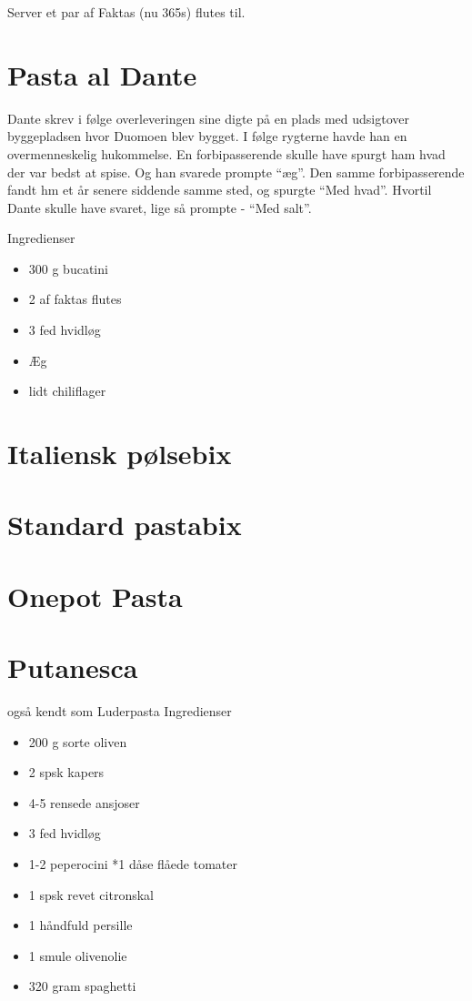 \documentclass[
]{book}
\providecommand{\tightlist}{%
  \setlength{\itemsep}{0pt}\setlength{\parskip}{0pt}}
\begin{document}
Server et par af Faktas (nu 365s) flutes til.

\hypertarget{pasta-al-dante}{%
\section{Pasta al Dante}\label{pasta-al-dante}}

Dante skrev i følge overleveringen sine digte på en plads med udsigtover byggepladsen hvor Duomoen blev bygget. I følge rygterne havde han en overmenneskelig hukommelse.
En forbipasserende skulle have spurgt ham hvad der var bedst at spise. Og han svarede prompte ``æg''. Den samme forbipasserende fandt hm et år senere siddende samme sted, og spurgte ``Med hvad''. Hvortil Dante skulle have svaret, lige så prompte - ``Med salt''.

Ingredienser

\begin{itemize}
\tightlist
\item
  300 g bucatini
\item
  2 af faktas flutes
\item
  3 fed hvidløg
\item
  Æg
\item
  lidt chiliflager
\end{itemize}

\hypertarget{italiensk-puxf8lsebix}{%
\section{Italiensk pølsebix}\label{italiensk-puxf8lsebix}}

\hypertarget{standard-pastabix}{%
\section{Standard pastabix}\label{standard-pastabix}}

\hypertarget{onepot-pasta}{%
\section{Onepot Pasta}\label{onepot-pasta}}

\hypertarget{putanesca}{%
\section{Putanesca}\label{putanesca}}

også kendt som Luderpasta
Ingredienser

\begin{itemize}
\tightlist
\item
  200 g sorte oliven
\item
  2 spsk kapers
\item
  4-5 rensede ansjoser
\item
  3 fed hvidløg
\item
  1-2 peperocini
  *1 dåse flåede tomater
\item
  1 spsk revet citronskal
\item
  1 håndfuld persille
\item
  1 smule olivenolie
\item
  320 gram spaghetti
\end{itemize}
\end{document}
